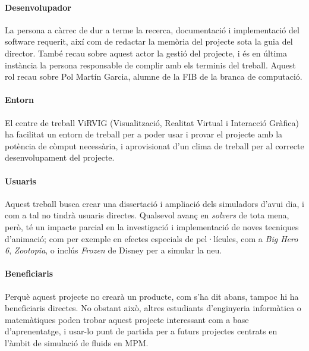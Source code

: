 \documentclass[a4paper]{report}
\begin{document}
	\paragraph{Desenvolupador} La persona a càrrec de dur a terme la recerca, documentació i implementació del software requerit, així com de redactar la memòria del projecte sota la guia del director. També recau sobre aquest actor la gestió del projecte, i és en última instància la persona responsable de complir amb els terminis del treball. Aquest rol recau sobre Pol Martín Garcia, alumne de la FIB de la branca de computació.
	\paragraph{Entorn} El centre de treball ViRVIG (Visualització, Realitat Virtual i Interacció Gràfica) ha facilitat un entorn de treball per a poder usar i provar el projecte amb la potència de còmput necessària, i aprovisionat d'un clima de treball per al correcte desenvolupament del projecte.
	\paragraph{Usuaris} Aquest treball busca crear una dissertació i ampliació dels simuladors d'avui dia, i com a tal no tindrà usuaris directes. Qualsevol avanç en \textit{solvers} de tota mena, però, té un impacte parcial en la investigació i implementació de noves tecniques d'animació; com per exemple en efectes especials de pel·lícules, com a \textit{Big Hero 6}, \textit{Zootopia}, o inclús \textit{Frozen} de Disney \cite{Stomakhin} per a simular la neu.
	\paragraph{Beneficiaris} Perquè aquest projecte no crearà un producte, com s'ha dit abans, tampoc hi ha beneficiaris directes. No obstant això, altres estudiants d'enginyeria informàtica o matemàtiques poden trobar aquest projecte interessant com a base d'aprenentatge, i usar-lo punt de partida per a futurs projectes centrats en l'àmbit de simulació de fluids en MPM.
	
\end{document}
